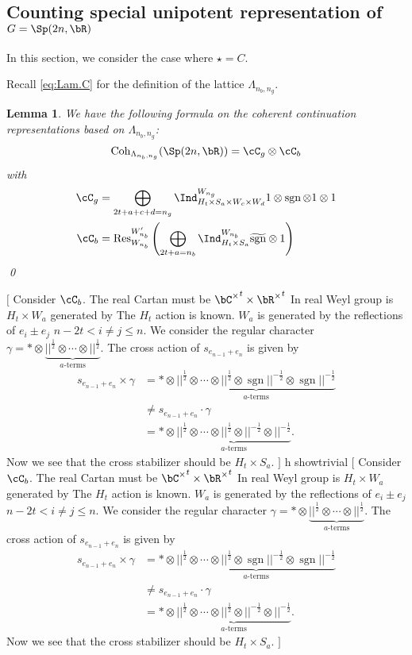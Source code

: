 \documentclass[12pt,a4paper]{amsart}
\newcommand{\trivial}[2][]{\if\relax\detokenize{#1}\relax
  {%
      \color{orange} \vspace{0em} $[$  #2 $]$
      \color{black}
  }
  \else
\ifx#1h
\ifcsname showtrivial\endcsname
{%
    \color{orange} \vspace{0em}  $[$ #2 $]$
    \color{black}
}
\fi
\else {\red Wrong argument!} \fi
\fi
}
\newcommand{\Res}{\mathrm{Res}}
\def\abs#1{\left|{#1}\right|}
\newcommand{\sgn}{\operatorname{sgn}}
\numberwithin{equation}{section}
\newtheorem{lem}[thm]{Lemma}
\theoremstyle{remark}
\def\half{{\tfrac{1}{2}}}
\def\Coh{\mathrm{Coh}}
\def\hsgn{\widetilde{\mathrm{sgn}}}
\begin{document}
\subsection{Counting special unipotent representation of $G = \Sp(2n,\bR)$}

In this section, we consider the case where $\star = C$.

Recall \eqref{eq:Lam.C} for the definition of the lattice
$\Lambda_{n_{b},n_{g}}$.

\begin{lem}
  We have the following formula on the coherent continuation representations
  based on $\Lambda_{n_{b},n_{g}}$:
  \[
    \Coh_{\Lambda_{n_{b},n_{g}}}(\Sp(2n,\bR)) = \cC_g\otimes \cC_b
  \]
  with
  \[
    \begin{split}
      \cC_g &=
      \bigoplus_{2t+a+c+d=n_{g}}\Ind_{H_{t} \times S_{a} \times W_c\times W_d}^{W_{n_{g}}} 1 \otimes \sgn \otimes 1 \otimes 1\\
      \cC_b &= \Res_{W_{n_{b}}}^{W'_{n_{b}}}\left( \bigoplus_{\substack{2t+a=n_{b}}} \Ind_{H_{t} \times S_a}^{W_{n_{b}}} \hsgn\otimes 1\right) \\
    \end{split}
  \]
  \qed
\end{lem}

\trivial{ Consider $\cC_{b}$. The real Cartan must be
  ${\bC^{\times}}^{t} \times {\bR^{\times}}^{t}$ In real Weyl group is
  $H_{t}\times W_{a}$ generated by The $H_{t}$ action is known. $W_{a}$ is
  generated by the reflections of $e_{i}\pm e_{j}$ $n-2t<i\neq j\leq n$. We
  consider the regular character
  $\gamma = *\otimes \underbrace{\abs{}^{\half}\otimes \cdots \otimes \abs{}^{\half}}_{a\text{-terms}}$.
  The cross action of $s_{e_{n-1}+e_{n}}$ is given by
  \[
    \begin{split}
      s_{e_{n-1}+e_{n}}\times \gamma & = *\otimes \underbrace{\abs{}^{\half}\otimes \cdots \otimes \abs{}^{\half} \otimes \sgn \abs{}^{-\half}
        \otimes \sgn \abs{}^{-\half}}_{a\text{-terms}} \\
      &\neq
      s_{e_{n-1}+e_{n}}\cdot \gamma \\
      &= *\otimes \underbrace{\abs{}^{\half}\otimes \cdots \otimes \abs{}^{\half} \otimes \abs{}^{-\half} \otimes \abs{}^{-\half}}_{a\text{-terms}}.
    \end{split}
  \]
  Now we see that the cross stabilizer should be
  $H_{t}\times S_{a}$.
}
\end{document}
